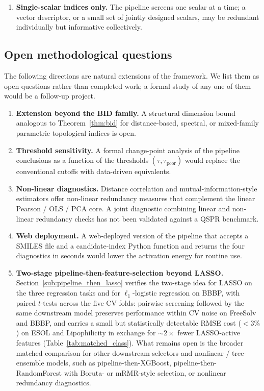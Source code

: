 \documentclass[STIX1COL]{WileyNJDv5}
\theoremstyle{definition}
\begin{document}
\begin{enumerate}
\item \textbf{Single-scalar indices only.} The pipeline screens one
scalar at a time; a vector descriptor, or a small set of jointly
designed scalars, may be redundant individually but informative
collectively.
\end{enumerate}

\subsection{Open methodological questions}

The following directions are natural extensions of the framework.
We list them as open questions rather than completed work; a
formal study of any one of them would be a follow-up project.

\begin{enumerate}
\item \textbf{Extension beyond the BID family.} A structural
dimension bound analogous to Theorem~\ref{thm:bid} for
distance-based, spectral, or mixed-family parametric topological
indices is open.
\item \textbf{Threshold sensitivity.} A formal change-point
analysis of the pipeline conclusions as a function of the
thresholds $(\tau, \tau_{\mathrm{pcor}})$ would replace the
conventional cutoffs with data-driven equivalents.
\item \textbf{Non-linear diagnostics.} Distance correlation and
mutual-information-style estimators offer non-linear redundancy
measures that complement the linear Pearson / OLS / PCA core. A
joint diagnostic combining linear and non-linear redundancy
checks has not been validated against a QSPR benchmark.
\item \textbf{Web deployment.} A web-deployed version of the
pipeline that accepts a SMILES file and a candidate-index Python
function and returns the four diagnostics in seconds would lower
the activation energy for routine use.
\item \textbf{Two-stage pipeline-then-feature-selection beyond
LASSO.} Section~\ref{sub:pipeline_then_lasso} verifies the
two-stage idea for LASSO on the three regression tasks and for
$\ell_1$-logistic regression on BBBP, with paired $t$-tests across
the five CV folds: pairwise screening followed by the same
downstream model preserves performance within CV noise on
FreeSolv and BBBP, and carries a small but statistically
detectable RMSE cost ($<3\%$) on ESOL and Lipophilicity in
exchange for ${\sim}\!2\times$ fewer LASSO-active features
(Table~\ref{tab:matched_class}). What remains open is the broader
matched comparison for other downstream selectors and nonlinear /
tree-ensemble models, such as pipeline-then-XGBoost,
pipeline-then-RandomForest with Boruta- or mRMR-style selection,
or nonlinear redundancy diagnostics.
\end{enumerate}
\end{document}
